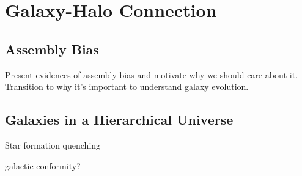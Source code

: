 \chapter{Galaxy-Halo Connection } 

\section{Assembly Bias} %
Present evidences of assembly bias and motivate why we should care about it. 
Transition to why it's important to understand galaxy evolution. 

\section{Galaxies in a Hierarchical Universe} 
\begin{enumerate} 
{\item Star formation quenching} 

{\item galactic conformity?} 

\end{enumerate} 
